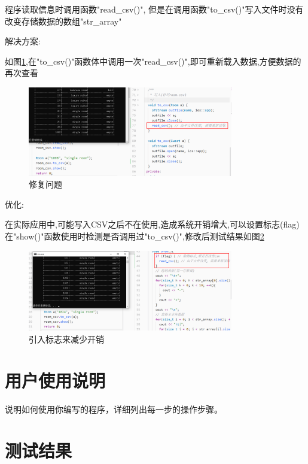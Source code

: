 \documentclass[UTF8]{ctexart}
\begin{document}
    程序读取信息时调用函数"read\_csv()", 但是在调用函数"to\_csv()"写入文件时没有改变存储数据的数组"str\_array"


    解决方案:

    如图\ref{fig:bug_2_fixed},在"to\_csv()"函数体中调用一次"read\_csv()",即可重新载入数据,方便数据的再次查看
    \begin{figure}[H]
      \centering
      \includegraphics[width=0.8\textwidth]{bug_2_fixed}
      \caption{修复问题}
      \label{fig:bug_2_fixed}
    \end{figure}

    优化:

    在实际应用中,可能写入CSV之后不在使用,造成系统开销增大,可以设置标志(flag)在"show()"函数使用时检测是否调用过"to\_csv()",修改后测试结果如图\ref{fig:bug_2_more}

    \begin{figure}[H]
      \centering
      \includegraphics[width=0.8\textwidth]{bug_2_more}
      \caption{引入标志来减少开销}
      \label{fig:bug_2_more}
    \end{figure}



\section{用户使用说明}
  说明如何使用你编写的程序，详细列出每一步的操作步骤。
\section{测试结果}
\end{document}
